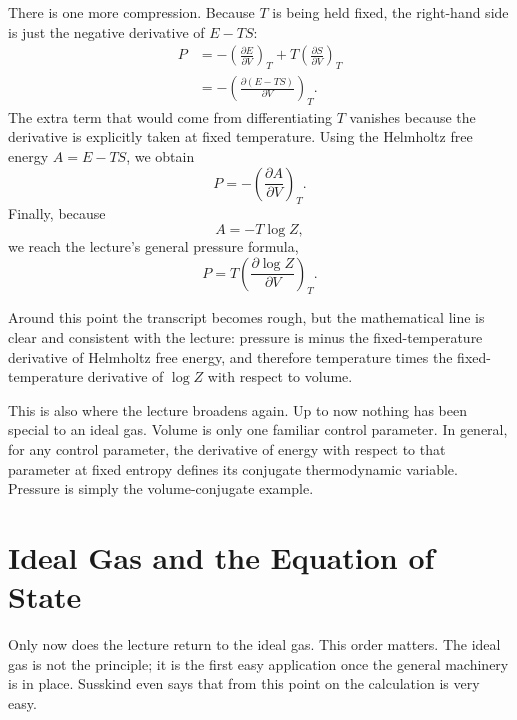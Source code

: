 There is one more compression. Because \(T\) is being held fixed, the right-hand side is just the negative derivative of \(E-TS\):
\begin{align}
P
&=
-
\left(\frac{\partial E}{\partial V}\right)_T
+
T\left(\frac{\partial S}{\partial V}\right)_T \\
&=
-
\left(\frac{\partial (E-TS)}{\partial V}\right)_T.
\end{align}
The extra term that would come from differentiating \(T\) vanishes because the derivative is explicitly taken at fixed temperature. Using the Helmholtz free energy \(A=E-TS\), we obtain
\begin{equation}
P=-\left(\frac{\partial A}{\partial V}\right)_T.
\end{equation}
Finally, because
\begin{equation}
A=-T\log Z,
\end{equation}
we reach the lecture's general pressure formula,
\begin{equation}
P
=
T\left(\frac{\partial \log Z}{\partial V}\right)_T.
\end{equation}

Around this point the transcript becomes rough, but the mathematical line is clear and consistent with the lecture: pressure is minus the fixed-temperature derivative of Helmholtz free energy, and therefore temperature times the fixed-temperature derivative of \(\log Z\) with respect to volume.

This is also where the lecture broadens again. Up to now nothing has been special to an ideal gas. Volume is only one familiar control parameter. In general, for any control parameter, the derivative of energy with respect to that parameter at fixed entropy defines its conjugate thermodynamic variable. Pressure is simply the volume-conjugate example.

\section{Ideal Gas and the Equation of State}

Only now does the lecture return to the ideal gas. This order matters. The ideal gas is not the principle; it is the first easy application once the general machinery is in place. Susskind even says that from this point on the calculation is very easy.

